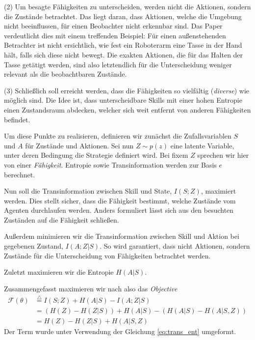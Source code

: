 (2) Um besagte Fähigkeiten zu unterscheiden, werden nicht die Aktionen, sondern die Zustände betrachtet. Das liegt daran, dass Aktionen, welche die Umgebung nicht beeinflussen, für einen Beobachter nicht erkennbar sind. Das Paper verdeutlicht dies mit einem treffenden Beispiel: Für einen außenstehenden Betrachter ist nicht ersichtlich, wie fest ein Roboterarm eine Tasse in der Hand hält, falls sich diese nicht bewegt. Die exakten Aktionen, die für das Halten der Tasse getätigt werden, sind also letztendlich für die Unterscheidung weniger relevant als die beobachtbaren Zustände.

(3) Schließlich soll erreicht werden, dass die Fähigkeiten so vielfältig (\textit{diverse}) wie möglich sind. Die Idee ist, dass unterscheidbare Skills mit einer hohen Entropie einen Zustandsraum abdecken, welcher sich weit entfernt von anderen Fähigkeiten befindet.

\smallspace

Um diese Punkte zu realisieren, definieren wir zunächst die Zufallsvariablen $ S $ und $ A $ für Zustände und Aktionen. Sei nun $ Z \sim p(z) $ eine latente Variable, unter deren Bedingung die Strategie definiert wird. Bei fixem $ Z $ sprechen wir hier von einer \textit{Fähigkeit}. Entropie sowie Transinformation werden zur Basis $ e $ berechnet.

Nun soll die Transinformation zwischen Skill und State, $ I(S;Z) $, maximiert werden. Dies stellt sicher, dass die Fähigkeit bestimmt, welche Zustände vom Agenten durchlaufen werden. Anders formuliert lässt sich aus den besuchten Zuständen auf die Fähigkeit schließen.

Außerdem minimieren wir die Transinformation zwischen Skill und Aktion bei gegebenen Zustand, $ I(A; Z | S) $. So wird garantiert, dass nicht Aktionen, sondern Zustände für die Unterscheidung von Fähigkeiten betrachtet werden.

Zuletzt maximieren wir die Entropie $ H(A|S) $.

\smallspace

Zusammengefasst maximieren wir nach \cite{diversity_eysenbach} also das \textit{Objective}
\begin{align}
    \mathcal{F}(\theta) &\stackrel{\triangle}{=} I(S;Z) + H(A|S) - I(A;Z|S) \label{eq:objective_1}\\
    & = (H(Z) - H(Z|S)) + H(A|S) - (H(A|S) - H(A|S,Z)) \nonumber\\
    & = H(Z) - H(Z|S) + H(A|S,Z) \label{eq:objective_intuitive}
\end{align}
Der Term wurde unter Verwendung der Gleichung \eqref{eq:trans_ent} umgeformt.

